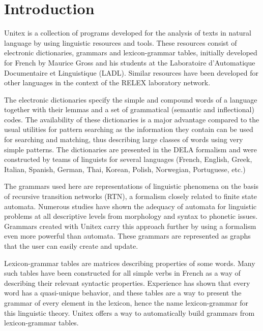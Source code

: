 \chapter*{Introduction}

Unitex is a collection of programs developed for the analysis of texts in
natural language by using linguistic resources and tools. These resources
consist of electronic dictionaries, grammars and lexicon-grammar tables,
initially developed  for French by Maurice Gross and his students  at the
Laboratoire d'Automatique Documentaire et Linguistique (LADL).
Similar resources have been developed for other languages in the context of the
RELEX laboratory network.

\bigskip
\noindent The electronic dictionaries specify the simple and compound words of a
language together with their lemmas and a set of grammatical (semantic and inflectional)
codes. The availability of these dictionaries is a major advantage compared to
the usual utilities for pattern searching as the information they contain can be
used  for searching and matching,  thus  describing large classes of words using
very simple patterns. The dictionaries are presented in the DELA formalism and
were constructed  by teams of  linguists for several languages (French, English,
Greek, Italian, Spanish, German, Thai, Korean, Polish, Norwegian, Portuguese,
etc.)

\bigskip
\noindent The grammars used here are representations of linguistic phenomena on the
basis of  recursive transition networks (RTN), a formalism closely related to
finite state automata. Numerous studies have shown the adequacy of automata for
linguistic problems at all descriptive levels  from morphology and syntax to
phonetic issues. Grammars created with Unitex carry this approach further  by
using a formalism even more powerful than automata. These grammars are
represented as graphs that the user can easily create and update.

\bigskip
\noindent Lexicon-grammar tables are matrices describing
properties of some words. Many such tables have been constructed   for all
simple verbs in French as a way of describing their relevant
syntactic properties. Experience has shown that every word has a
quasi-unique behavior, and these tables are a way to present the 
grammar of every element in the lexicon, hence the name lexicon-grammar 
for this linguistic theory. Unitex offers a way to
automatically build grammars from lexicon-grammar tables.

